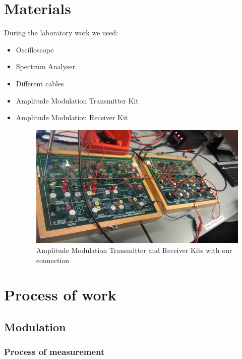 \documentclass[english]{article}
\begin{document}
\section{Materials}
During the laboratory work we used:
\begin{itemize}
\item Oscilloscope
\item Spectrum Analyser  
\item Different cables
\item Amplitude Modulation Transmitter Kit 
\item Amplitude Modulation Receiver Kit 
\begin{figure}[H]
\centerline{\includegraphics[scale=0.2]{AM/10Connection}}
\caption{Amplitude Modulation Transmitter and Receiver Kits with our connection}
\end{figure}
\end{itemize}


\section{Process of work}
\subsection{Modulation}
\subsubsection{Process of measurement}
\end{document}
